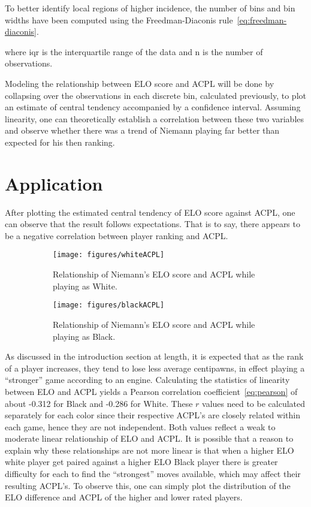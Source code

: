 \documentclass[12pt, letterpaper, titlepage]{article}
\begin{document}
To better identify local regions of higher incidence, the number of bins and bin widths have been computed
 using the Freedman-Diaconis rule~\ref{eq:freedman-diaconis}.

where iqr is the interquartile range of the data and n is the number of observations.

Modeling the relationship between ELO score and ACPL will be done by collapsing over the observations in 
each discrete bin, calculated previously, to plot an estimate of central tendency accompanied by a confidence
 interval. Assuming linearity, one can theoretically establish a correlation between these two variables and
  observe whether there was a trend of Niemann playing far better than expected for his then ranking.

\section{Application}
\label{sec:app}

After plotting the estimated central tendency of ELO score against ACPL, one can observe that the result 
follows expectations. That is to say, there appears to be a negative correlation between player ranking and 
ACPL.

\begin{figure}[!htb]
    \centering
    \begin{subfigure}{.5\textwidth}
      \centering
      \texttt{[image: figures/whiteACPL]}
      \caption{Relationship of Niemann's ELO score and ACPL while playing as White.}
      \label{fig:sub1}
    \end{subfigure}
    \begin{subfigure}{.5\textwidth}
      \centering
      \texttt{[image: figures/blackACPL]}
      \caption{Relationship of Niemann's ELO score and ACPL while playing as Black.}
      \label{fig:sub2}
    \end{subfigure}
    \caption{}
    \label{fig:test}
\end{figure}

As discussed in the introduction section at length, it is expected that as the rank of a player increases, 
they tend to lose less average centipawns, in effect playing a “stronger” game according to an engine. 
Calculating the statistics of linearity between ELO and ACPL yields a Pearson correlation 
coefficient~\ref{eq:pearson} of about -0.312 for Black and -0.286 for White. These \begin{math}r\end{math}
 values need to be calculated separately for each color since their respective ACPL's are closely related 
 within each game, hence they are not independent. Both values reflect a weak to moderate linear relationship 
 of ELO and ACPL. It is possible that a reason to explain why these relationships are not more linear is that 
 when a higher ELO white player get paired against a higher ELO Black player there is greater difficulty for 
 each to find the “strongest” moves available, which may affect their resulting ACPL's. To observe this, one 
 can simply plot the distribution of the ELO difference and ACPL of the higher and lower rated players.
\end{document}
